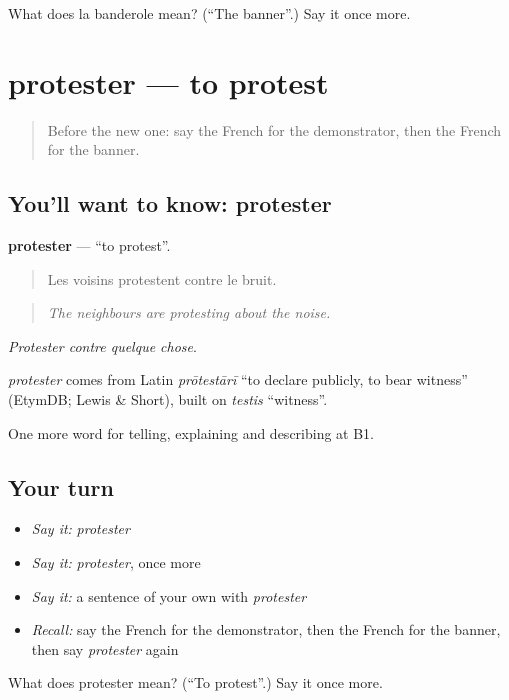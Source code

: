 \begin{tcolorbox}[breakable,colback=teal!4,colframe=teal!35!black,title={Before you move on}]
What does la banderole mean? (\textquotedblleft{}The banner\textquotedblright{}.) Say it once more.
\end{tcolorbox}
\section[protester]{protester — to protest}

\label{lesson:FR-C363-protester}



\begin{quote}
Before the new one: say the French for the demonstrator, then the French for the banner.
\end{quote}

\subsection*{You'll want to know: protester}
\textbf{protester} — \textquotedblleft{}to protest\textquotedblright{}.

\begin{quote}
Les voisins protestent contre le bruit.
\end{quote}

\begin{quote}
\emph{The neighbours are protesting about the noise.}
\end{quote}

\emph{Protester contre quelque chose}.

\begin{cousinweb}
\emph{protester} comes from Latin \emph{prōtestārī} \textquotedblleft{}to declare publicly, to bear witness\textquotedblright{} (EtymDB; Lewis \& Short), built on \emph{testis} \textquotedblleft{}witness\textquotedblright{}.
\end{cousinweb}

\begin{grammarlens}[title={What you've built}]
One more word for telling, explaining and describing at B1.
\end{grammarlens}

\subsection*{Your turn}
\begin{itemize}
\raggedright
  \item \emph{Say it:} \emph{protester}
  \item \emph{Say it:} \emph{protester}, once more
  \item \emph{Say it:} a sentence of your own with \emph{protester}
  \item \emph{Recall:} say the French for the demonstrator, then the French for the banner, then say \emph{protester} again
\end{itemize}

\begin{tcolorbox}[breakable,colback=teal!4,colframe=teal!35!black,title={Before you move on}]
What does protester mean? (\textquotedblleft{}To protest\textquotedblright{}.) Say it once more.
\end{tcolorbox}
